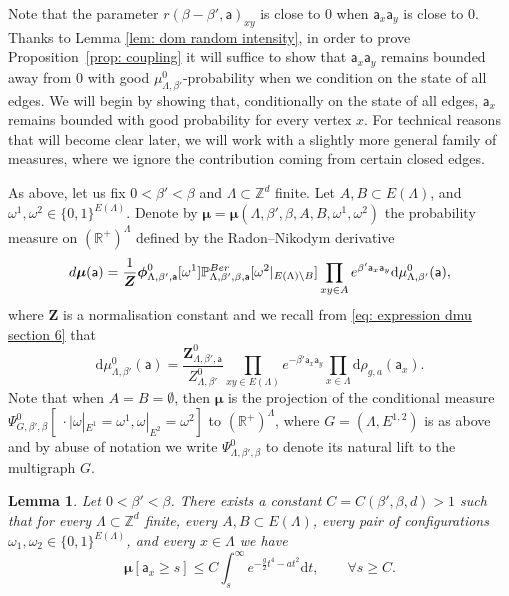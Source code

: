 \documentclass[11pt,a4paper]{article}
\newtheorem{lemma}[theorem]{Lemma}
\theoremstyle{definition}
\numberwithin{equation}{section}
\begin{document}
Note that the parameter $r(\beta-\beta',\mathsf{a})_{xy}$ is close to $0$ when $\mathsf{a}_x\mathsf{a}_y$ is close to $0$. Thanks to Lemma \ref{lem: dom random intensity}, in order to prove Proposition~\ref{prop: coupling} it will suffice to show that $\mathsf{a}_x\mathsf{a}_y$ remains bounded away from $0$ with good $\mu^0_{\Lambda,\beta'}$-probability when we condition on the state of all edges. We will begin by showing that, conditionally on the state of all edges, $\mathsf{a}_x$ remains bounded with good probability for every vertex $x$. For technical reasons that will become clear later, we will work with a slightly more general family of measures, where we ignore the contribution coming from certain closed edges.

As above, let us fix $0<\beta'<\beta$ and $\Lambda \subset \mathbb Z^d$ finite. Let $A,B \subset E(\Lambda)$, and  $\omega^1,\omega^2 \in \{0,1\}^{E(\Lambda)}$. Denote by $\boldsymbol \mu=\boldsymbol \mu(\Lambda,\beta',\beta,A,B,\omega^1,\omega^2)$ the probability measure on $(\mathbb R^+)^\Lambda$ defined by the Radon--Nikodym derivative
\begin{equation}
d\boldsymbol\mu(\mathsf a) = \frac{1}{\boldsymbol Z}\boldsymbol \phi^0_{\Lambda,\beta',\mathsf a}[\omega^1] \mathbb P^{\rm Ber}_{\Lambda,\beta',\beta,\mathsf a}[\omega^2|_{E(\Lambda)\setminus B}] \prod_{xy \in A}e^{\beta' \mathsf a_x \mathsf a_y} \mathrm{d}\mu^0_{\Lambda,\beta'}(\mathsf a),
\end{equation}
where $\boldsymbol Z$ is a normalisation constant and we recall from \eqref{eq: expression dmu section 6} that
\begin{equation}
\mathrm{d}\mu^0_{\Lambda,\beta'}(\mathsf{a})=\frac{\mathbf{Z}^{0}_{\Lambda,\beta',\mathsf{a}} }{Z^0_{\Lambda,\beta'}} \prod_{xy\in E(\Lambda)} e^{-\beta' \mathsf{a}_x \mathsf{a}_y} \prod_{x\in \Lambda} \mathrm{d}\rho_{g,a}(\mathsf{a}_x).
\end{equation}
Note that when $A=B=\emptyset$, then $\boldsymbol \mu$ is the projection of the conditional measure $\Psi^0_{G,\beta',\beta}[\: \cdot \mid \omega|_{E^1}=\omega^1, \omega|_{E^2}=\omega^2]$ to $(\mathbb{R}^+)^{\Lambda}$, where $G=(\Lambda, E^{1,2})$ is as above and 
by abuse of notation we write $\Psi^0_{\Lambda,\beta',\beta}$ to denote its natural lift to the multigraph $G$. 

\begin{lemma}\label{lem: cond regularity}
Let $0<\beta'<\beta$. There exists a constant $C=C(\beta',\beta,d)>1$ such that for every $\Lambda\subset \mathbb{Z}^d$ finite, every $A,B\subset E(\Lambda)$, every pair of configurations $\omega_1, \omega_2 \in \{0,1\}^{E(\Lambda)}$, and every $x\in \Lambda$ we have
\begin{equation}
\boldsymbol \mu [ \mathsf a_x \geq s] \leq C \int_s^\infty e^{-\frac g2 t^4 - at^2} \mathrm{d}t, \qquad \forall s \geq C. 
\end{equation}
\end{lemma}
\end{document}
